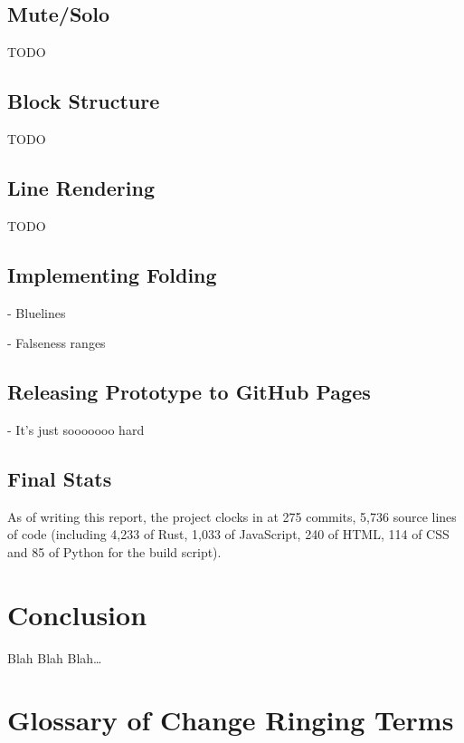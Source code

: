 \documentclass[12pt]{article}
\begin{document}
\subsection{Mute/Solo}

TODO

\subsection{Block Structure}

TODO

\subsection{Line Rendering}

TODO

\subsection{Implementing Folding}

- Bluelines

- Falseness ranges

\subsection{Releasing Prototype to GitHub Pages}

- It's just sooooooo hard

\subsection{Final Stats}

As of writing this report, the project clocks in at 275 commits, 5,736 source lines of code
(including 4,233 of Rust, 1,033 of JavaScript, 240 of HTML, 114 of CSS and 85 of Python for the
build script).



\pagebreak

\section{Conclusion}

Blah Blah Blah\ldots



\pagebreak

\section{Glossary of Change Ringing Terms}
\end{document}
